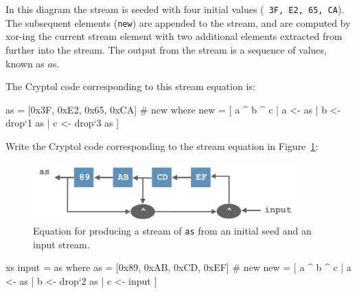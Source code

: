 In this diagram the stream is seeded with four initial values ({\tt
  3F, E2, 65, CA}). The subsequent elements ({\tt new}) are appended
to the stream, and are computed by xor-ing the current stream element
with two additional elements extracted from further into the stream.
The output from the stream is a sequence of values, known as $a$s.

The Cryptol code corresponding to this stream equation is:
\begin{code}
  as  = [0x3F, 0xE2, 0x65, 0xCA] # new
    where
      new = [ a ^ b ^ c | a <- as
                        | b <- drop`{1} as
                        | c <- drop`{3} as ]
\end{code}

{}

\begin{Exercise}\label{ex:streamEq}
  Write the Cryptol code corresponding to the stream equation in
  Figure~\ref{fig:streamExercise}:
\end{Exercise}
\begin{figure}[htbp]
\centering
\includegraphics[width=4in]{crashCourse/streamExercise}
\caption{Equation for producing a stream of {\tt as} from an initial
  seed and an input stream.}
\label{fig:streamExercise}
\end{figure}


\begin{Answer}
\begin{code}
  xs input = as where
     as = [0x89, 0xAB, 0xCD, 0xEF] # new
     new = [ a ^ b ^ c | a <- as
                       | b <- drop`{2} as
                       | c <- input ]
\end{code}
\end{Answer}

\indTypSynonym

